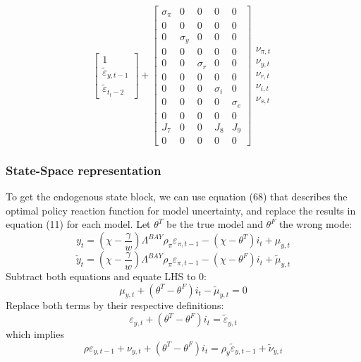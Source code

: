\documentclass{beamer}
\begin{document}
\begin{frame}
{\begin{equation}
\begin{bmatrix}
1 \\
\tilde{\varepsilon}_{y,t-1} \\
\tilde{\varepsilon}_{t_t-2}
\end{bmatrix}
+
\begin{bmatrix}
\sigma_\pi & 0 & 0 & 0 & 0 \\
0 & 0 & 0 & 0 & 0 \\
0 & \sigma_y & 0 & 0 & 0 \\
0 & 0 & 0 & 0 & 0 \\
0 & 0 & \sigma_r & 0 & 0 \\
0 & 0 & 0 & 0 & 0 \\
0 & 0 & 0 & \sigma_i & 0 \\
0 & 0 & 0 & 0 & \sigma_e \\
0 & 0 & 0 & 0 & 0 \\
J_7 & 0 & 0 & J_8 & J_9 \\
0 & 0 & 0 & 0 & 0
\end{bmatrix}
\begin{matrix}
\nu_{\pi,t} \\
\nu_{y,t} \\
\nu_{r,t} \\
\nu_{i,t} \\
\nu_{s,t} 
\end{matrix}
\end{equation}
}
\end{frame}

\begin{frame} 
\frametitle{State-Space representation}
To get the endogenous state block, we can use equation (68)  that describes the
optimal policy reaction function for model uncertainty, and replace the results
in equation (11) for each model. Let $\theta^T$ be the true model and $\theta^F$
the wrong mode:
\begin{equation}
y_t = \left ( \chi - \frac{\gamma}{w} \right ) \Lambda^{BAY} \rho_\pi \varepsilon_{\pi,t-1} - \left ( \chi - \theta^T \right ) i_t + \mu_{y,t}
\end{equation}
\begin{equation}
\tilde{y}_t = \left (\chi - \frac{\gamma}{w} \right ) \Lambda^{BAY} \rho_\pi \varepsilon_{\pi,t-1} - \left ( \chi - \theta^F \right ) i_t + \tilde{\mu}_{y,t}
\end{equation}
Subtract both equations and equate LHS to 0:
\begin{equation}
\mu_{y,t} + \left ( \theta^T - \theta^F \right ) i_t - \tilde{\mu}_{y,t} = 0
\end{equation}
Replace both terms by their respective definitions:
\begin{equation}
\varepsilon_{y,t} + \left ( \theta^T - \theta^F \right ) i_t = \tilde{\varepsilon}_{y,t}
\end{equation}
which implies
\begin{equation}
\rho \varepsilon_{y,t-1} + \nu_{y,t} + \left ( \theta^T - \theta^F \right) i_t = \rho_y \tilde{\varepsilon}_{y,t-1} + \tilde{\nu}_{y,t}
\end{equation}
\end{frame}
\end{document}
